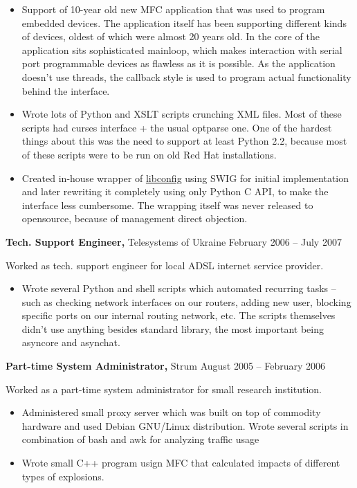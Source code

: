 \documentclass[margin]{res}
\begin{document}
\begin{resume}
\begin{itemize} \itemsep -1pt
\item Support of 10-year old new MFC application
  that was used to program embedded devices. The application itself
  has been supporting different kinds of devices, oldest of which
  were almost 20 years old. In the core of the application sits
  sophisticated mainloop, which makes interaction with serial port
  programmable devices as flawless as it is possible.
  As the application doesn't use threads, the callback style is
  used to program actual functionality behind the interface.
\item Wrote lots of Python and XSLT scripts
  crunching XML files. Most of these scripts had curses interface +
  the usual optparse one. One of the hardest things about this was
  the need to support at least Python 2.2, because most of these scripts
  were to be run on old Red Hat installations.
\item Created in-house wrapper of
  \href{http://www.hyperrealm.com/libconfig/}{libconfig} using SWIG for initial
  implementation and later rewriting it completely using only Python C API, to make
  the interface less cumbersome. The wrapping itself was never released to
  opensource, because of management direct objection.
\end{itemize}



{\bf Tech. Support Engineer,} Telesystems of Ukraine \hfill February 2006 -- July 2007

Worked as tech. support engineer for local ADSL internet
service provider.\\

\begin{itemize} \itemsep -1pt
\item Wrote several Python and shell scripts which
  automated recurring tasks -- such as checking network
  interfaces on our routers, adding new user, blocking
  specific ports on our internal routing network, etc.
  The scripts themselves didn't use anything besides
  standard library, the most important being asyncore
  and asynchat.
\end{itemize}


{\bf Part-time System Administrator,} Strum \hfill August 2005 -- February 2006

Worked as a part-time system administrator for small research institution.

\begin{itemize} \itemsep -1pt
\item Administered small proxy server which was built on top of
  commodity hardware and used Debian GNU/Linux distribution. Wrote
  several scripts in combination of bash and awk for analyzing traffic usage
\item Wrote small C++ program usign MFC that calculated impacts of different
  types of explosions.
\end{itemize}


\end{resume}
\end{document}
